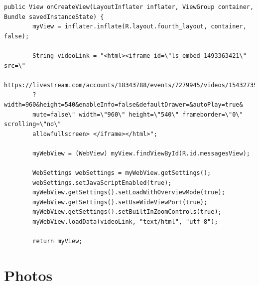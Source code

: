 \documentclass[letterpaper,10pt,draftclsnofoot,onecolumn,titlepage]{IEEEtran}
\begin{document}
\begin{lstlisting}[caption=Android Messages Page]
public View onCreateView(LayoutInflater inflater, ViewGroup container,
Bundle savedInstanceState) {
        myView = inflater.inflate(R.layout.fourth_layout, container, false);

        String videoLink = "<html><iframe id=\"ls_embed_1493363421\" src=\"
        https://livestream.com/accounts/18343788/events/7279945/videos/154327352/player
        ?width=960&height=540&enableInfo=false&defaultDrawer=&autoPlay=true&
        mute=false\" width=\"960\" height=\"540\" frameborder=\"0\" scrolling=\"no\"
        allowfullscreen> </iframe></html>";

        myWebView = (WebView) myView.findViewById(R.id.messagesView);

        WebSettings webSettings = myWebView.getSettings();
        webSettings.setJavaScriptEnabled(true);
        myWebView.getSettings().setLoadWithOverviewMode(true);
        myWebView.getSettings().setUseWideViewPort(true);
        myWebView.getSettings().setBuiltInZoomControls(true);
        myWebView.loadData(videoLink, "text/html", "utf-8");

        return myView;
		\end{lstlisting}


	\section{Photos}
\end{document}
